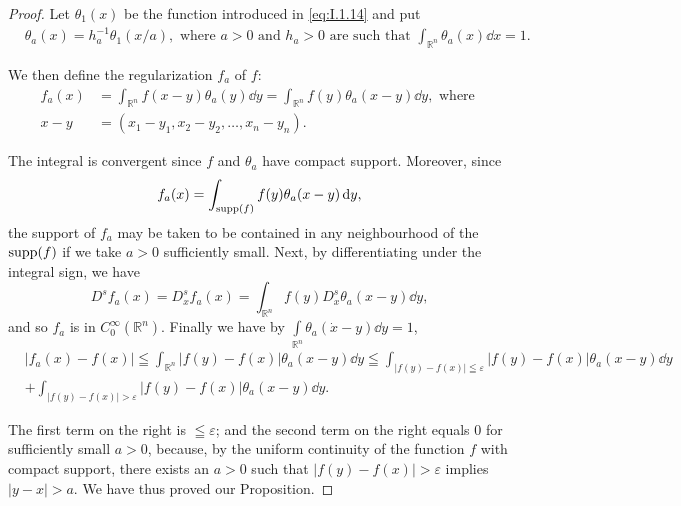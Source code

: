 \begin{proof}
 Let $\theta_{1}(x)$ be the function introduced in \eqref{eq:I.1.14} and put 
\begin{equation}\label{eq:I.1.15}
\begin{aligned}
&\theta_{a} (x) = h_{a} ^{-1} \theta_{1} (x / a), \text{ where } a > 0 \text{ and } h_{a} > 0 \text{ are such that } \int_ {\mathbb{R}^{n}} \theta_{a} (x) \dd x = 1.
\end{aligned}
\end{equation}

We then define the regularization $f_{a}$ of $f$: 
\begin{equation}\label{eq:I.1.16}
\begin{aligned}
f_{a} (x) &= \int_ {\mathbb{R}^{n}} f (x- y) \theta_{a} (y) \dd y = \int_ {\mathbb{R}^{n}} f (y) \theta_{a} (x- y) \dd y, \text{ where }
\\
x- y &= (x_{1}- y_{1}, x_{2}- y_{2}, \ldots , x_{n}- y_{n}).
\end{aligned}
\end{equation}

The integral is convergent since $f$ and $\theta_{a}$ have compact support. Moreover, since 
\[
f_{a} (x) = \int_ {\operatorname{supp} (f)} f (y) \theta_{a} (x- y) \mathop{}\!\mathrm{d} y,
\]
the support of $f_{a}$ may be taken to be contained in any neighbourhood of the $\operatorname{supp}(f)$ if we take $a > 0$ sufficiently small. Next, by differentiating under the integral sign, we have 
\begin{equation}\label{eq:I.1.17}
D ^{s} f_{a} (x) = D_{x} ^{s} f_{a} (x) = \int_ {\mathbb{R}^{n}} f (y) D_{x} ^{s} \theta_{a} (x- y) \dd y,
\end{equation}
and so $f_{a}$ is in $C_0^\infty (\mathbb{R}^{n})$. Finally we have by $\int \limits_{\mathbb{R}^{n}}\theta_a(\dot{x}-y)\dd y = 1$, 
\[
\begin{aligned}
&| f_{a} (x)- f (x) |  \leqq \int_ {\mathbb{R}^{n}} | f (y)- f (x) | \theta_{a} (x- y) \dd y \leqq \int_{| f (y)- f (x) | \leqq \varepsilon} | f (y)- f (x) | \theta_{a} (x- y) \dd y \\
&+ \int_{| f (y)- f (x) | > \varepsilon} | f (y)- f (x) | \theta_{a} (x- y) \dd y.
\end{aligned}
\]

The first term on the right is $\leqq\varepsilon$; and the second term on the right equals $0$ for sufficiently small $a>0$, because, by the uniform continuity of the function $f$ with compact support, there exists an $a>0$ such that $|f(y)-f(x)|>\varepsilon$ implies $|y-x|>a$. We have thus proved our Proposition. 
\end{proof}


